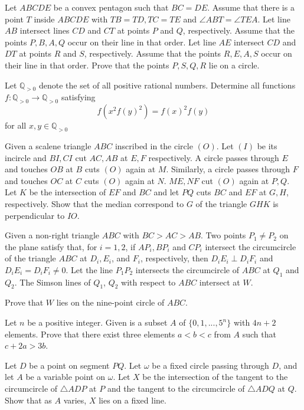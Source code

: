 \documentclass[11pt]{scrartcl}
\begin{document}
\begin{problem}[8417327567048605288]
Let $ABCDE$ be a convex pentagon such that $BC=DE$. Assume that there is a point $T$ inside $ABCDE$ with $TB=TD,TC=TE$ and $\angle ABT = \angle TEA$. Let line $AB$ intersect lines $CD$ and $CT$ at points $P$ and $Q$, respectively. Assume that the points $P,B,A,Q$ occur on their line in that order. Let line $AE$ intersect $CD$ and $DT$ at points $R$ and $S$, respectively. Assume that the points $R,E,A,S$ occur on their line in that order. Prove that the points $P,S,Q,R$ lie on a circle.
\end{problem}
\begin{problem}[8782897210450267045]
Let $\mathbb{Q}_{>0}$ denote the set of all positive rational numbers. Determine all functions $f:\mathbb{Q}_{>0}\to \mathbb{Q}_{>0}$ satisfying$$f(x^2f(y)^2)=f(x)^2f(y)$$for all $x,y\in\mathbb{Q}_{>0}$
\end{problem}
\begin{problem}[86986480818494]
Given a scalene triangle $ABC$ inscribed in the circle $(O)$. Let $(I)$ be its incircle and $BI,CI$ cut $AC,AB$ at $E,F$ respectively. A circle passes through $E$ and touches $OB$ at $B$ cuts $(O)$ again at $M$. Similarly, a circle passes through $F$ and touches $OC$ at $C$ cuts $(O)$ again at $N$. $ME,NF$ cut $(O)$ again at $P,Q$. Let $K$ be the intersection of $EF$ and $BC$ and let $PQ$ cuts $BC$ and $EF$ at $G,H$, respectively. Show that the median correspond to $G$ of the triangle $GHK$ is perpendicular to $IO$.
\end{problem}
\begin{problem}[8895719454292056765]
Given a non-right triangle $ABC$ with $BC>AC>AB$. Two points $P_1 \neq P_2$ on the plane satisfy that, for $i=1,2$, if $AP_i, BP_i$ and $CP_i$ intersect the circumcircle of the triangle $ABC$ at $D_i, E_i$, and $F_i$, respectively, then $D_iE_i \perp D_iF_i$ and $D_iE_i = D_iF_i \neq 0$. Let the line $P_1P_2$ intersects the circumcircle of $ABC$ at $Q_1$ and $Q_2$. The Simson lines of $Q_1$, $Q_2$ with respect to $ABC$ intersect at $W$.

Prove that $W$ lies on the nine-point circle of $ABC$.
\end{problem}
\begin{problem}[80567267310692]
Let $n$ be a positive integer. Given is a subset $A$ of $\{0,1,...,5^n\}$ with $4n+2$ elements. Prove that there exist three elements $a<b<c$ from $A$ such that $c+2a>3b$.
\end{problem}
\begin{problem}[8152181601565653036]
Let \(D\) be a point on segment \(PQ\). Let \(\omega\) be a fixed circle passing through \(D\), and let \(A\) be a variable point on \(\omega\). Let \(X\) be the intersection of the tangent to the circumcircle of \(\triangle ADP\) at \(P\) and the tangent to the circumcircle of \(\triangle ADQ\) at \(Q\). Show that as \(A\) varies, \(X\) lies on a fixed line.
\end{problem}
\end{document}
